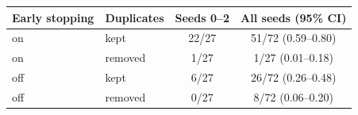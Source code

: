 \begin{tabular}{@{}llcc@{}}
\toprule
Early stopping & Duplicates & Seeds 0--2 & All seeds (95\% CI)\\
\midrule
on & kept & 22/27 & 51/72 (0.59--0.80) \\
on & removed & 1/27 & 1/27 (0.01--0.18) \\
off & kept & 6/27 & 26/72 (0.26--0.48) \\
off & removed & 0/27 & 8/72 (0.06--0.20) \\
\bottomrule
\end{tabular}

